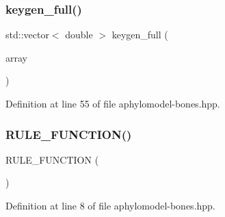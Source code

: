 \subsubsection{\texorpdfstring{keygen\+\_\+full()}{keygen\_full()}}
{\footnotesize\ttfamily std\+::vector$<$ double $>$ keygen\+\_\+full (\begin{DoxyParamCaption}\item[{const \hyperlink{namespacebarry_1_1counters_1_1phylo_abd293bf65e494e903639fb5fb2c91604}{phylocounters\+::\+Phylo\+Array} \&}]{array }\end{DoxyParamCaption})\hspace{0.3cm}{\ttfamily [inline]}}



Definition at line 55 of file aphylomodel-\/bones.\+hpp.

\mbox{\label{aphylomodel-bones_8hpp_a11c7dd7dca27f32547bb602f30ceb5e8}} 
\subsubsection{\texorpdfstring{R\+U\+L\+E\+\_\+\+F\+U\+N\+C\+T\+I\+O\+N()}{RULE\_FUNCTION()}}
{\footnotesize\ttfamily R\+U\+L\+E\+\_\+\+F\+U\+N\+C\+T\+I\+ON (\begin{DoxyParamCaption}\item[{rule\+\_\+empty\+\_\+free}]{ }\end{DoxyParamCaption})}



Definition at line 8 of file aphylomodel-\/bones.\+hpp.

